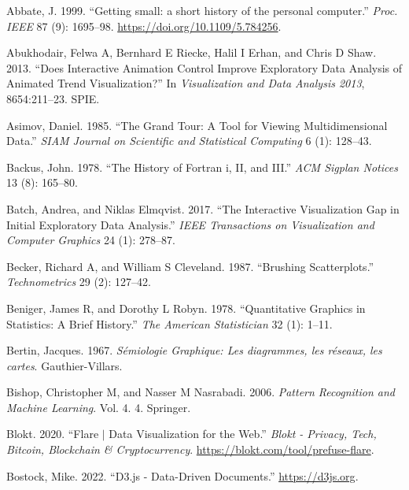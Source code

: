 \documentclass[
]{book}
\newlength{\cslhangindent}
\newenvironment{CSLReferences}[2] %
 {\begin{list}{}{%
  \setlength{\itemindent}{0pt}
  \setlength{\leftmargin}{0pt}
  \setlength{\parsep}{0pt}
  \ifodd #1
   \setlength{\leftmargin}{\cslhangindent}
   \setlength{\itemindent}{-1\cslhangindent}
  \fi
  \setlength{\itemsep}{#2\baselineskip}}}
 {\end{list}}
\begin{document}
\label{refs}
\begin{CSLReferences}{1}{0}
Abbate, J. 1999. {``{Getting small: a short history of the personal computer}.''} \emph{Proc. IEEE} 87 (9): 1695--98. \url{https://doi.org/10.1109/5.784256}.

Abukhodair, Felwa A, Bernhard E Riecke, Halil I Erhan, and Chris D Shaw. 2013. {``Does Interactive Animation Control Improve Exploratory Data Analysis of Animated Trend Visualization?''} In \emph{Visualization and Data Analysis 2013}, 8654:211--23. SPIE.

Asimov, Daniel. 1985. {``The Grand Tour: A Tool for Viewing Multidimensional Data.''} \emph{SIAM Journal on Scientific and Statistical Computing} 6 (1): 128--43.

Backus, John. 1978. {``The History of Fortran i, II, and III.''} \emph{ACM Sigplan Notices} 13 (8): 165--80.

Batch, Andrea, and Niklas Elmqvist. 2017. {``The Interactive Visualization Gap in Initial Exploratory Data Analysis.''} \emph{IEEE Transactions on Visualization and Computer Graphics} 24 (1): 278--87.

Becker, Richard A, and William S Cleveland. 1987. {``Brushing Scatterplots.''} \emph{Technometrics} 29 (2): 127--42.

Beniger, James R, and Dorothy L Robyn. 1978. {``Quantitative Graphics in Statistics: A Brief History.''} \emph{The American Statistician} 32 (1): 1--11.

Bertin, Jacques. 1967. \emph{{Sémiologie Graphique: Les diagrammes, les réseaux, les cartes}}. Gauthier-Villars.

Bishop, Christopher M, and Nasser M Nasrabadi. 2006. \emph{Pattern Recognition and Machine Learning}. Vol. 4. 4. Springer.

Blokt. 2020. {``Flare {\(\vert\)} Data Visualization for the Web.''} \emph{Blokt - Privacy, Tech, Bitcoin, Blockchain {\&} Cryptocurrency}. \url{https://blokt.com/tool/prefuse-flare}.

Bostock, Mike. 2022. {``D3.js - Data-Driven Documents.''} \url{https://d3js.org}.


\end{CSLReferences}
\end{document}

